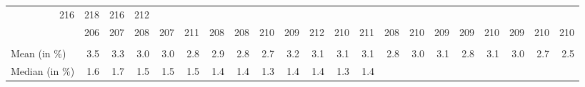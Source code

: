 \begin{tabular}{lllllllllllllllllllll}
  \multicolumn{1}{r}{216} &
  \multicolumn{1}{r}{218} &
  \multicolumn{1}{r}{216} &
  \multicolumn{1}{r}{212} \\
\multicolumn{1}{l}{\hspace{1em}{$\#$ origin countries}} &
  \multicolumn{1}{|r}{206} &
  \multicolumn{1}{r}{207} &
  \multicolumn{1}{r}{208} &
  \multicolumn{1}{r}{207} &
  \multicolumn{1}{r}{211} &
  \multicolumn{1}{r}{208} &
  \multicolumn{1}{r}{208} &
  \multicolumn{1}{r}{210} &
  \multicolumn{1}{r}{209} &
  \multicolumn{1}{r}{212} &
  \multicolumn{1}{r}{210} &
  \multicolumn{1}{r}{211} &
  \multicolumn{1}{r}{208} &
  \multicolumn{1}{r}{210} &
  \multicolumn{1}{r}{209} &
  \multicolumn{1}{r}{209} &
  \multicolumn{1}{r}{210} &
  \multicolumn{1}{r}{209} &
  \multicolumn{1}{r}{210} &
  \multicolumn{1}{r}{210} \\
\multicolumn{1}{l}{\hspace{1em}{\textit{Observed transport costs}}} &
  \multicolumn{1}{|r}{} &
  \multicolumn{1}{r}{} &
  \multicolumn{1}{r}{} &
  \multicolumn{1}{r}{} &
  \multicolumn{1}{r}{} &
  \multicolumn{1}{r}{} &
  \multicolumn{1}{r}{} &
  \multicolumn{1}{r}{} &
  \multicolumn{1}{r}{} &
  \multicolumn{1}{r}{} &
  \multicolumn{1}{r}{} &
  \multicolumn{1}{r}{} &
  \multicolumn{1}{r}{} &
  \multicolumn{1}{r}{} &
  \multicolumn{1}{r}{} &
  \multicolumn{1}{r}{} &
  \multicolumn{1}{r}{} &
  \multicolumn{1}{r}{} &
  \multicolumn{1}{r}{} &
  \multicolumn{1}{r}{} \\
\multicolumn{1}{l}{\hspace{2em}Mean (in $\%$)} &
  \multicolumn{1}{|r}{3.5} &
  \multicolumn{1}{r}{3.3} &
  \multicolumn{1}{r}{3.0} &
  \multicolumn{1}{r}{3.0} &
  \multicolumn{1}{r}{2.8} &
  \multicolumn{1}{r}{2.9} &
  \multicolumn{1}{r}{2.8} &
  \multicolumn{1}{r}{2.7} &
  \multicolumn{1}{r}{3.2} &
  \multicolumn{1}{r}{3.1} &
  \multicolumn{1}{r}{3.1} &
  \multicolumn{1}{r}{3.1} &
  \multicolumn{1}{r}{2.8} &
  \multicolumn{1}{r}{3.0} &
  \multicolumn{1}{r}{3.1} &
  \multicolumn{1}{r}{2.8} &
  \multicolumn{1}{r}{3.1} &
  \multicolumn{1}{r}{3.0} &
  \multicolumn{1}{r}{2.7} &
  \multicolumn{1}{r}{2.5} \\
\multicolumn{1}{l}{\hspace{2em}Median (in $\%$)} &
  \multicolumn{1}{|r}{1.6} &
  \multicolumn{1}{r}{1.7} &
  \multicolumn{1}{r}{1.5} &
  \multicolumn{1}{r}{1.5} &
  \multicolumn{1}{r}{1.5} &
  \multicolumn{1}{r}{1.4} &
  \multicolumn{1}{r}{1.4} &
  \multicolumn{1}{r}{1.3} &
  \multicolumn{1}{r}{1.4} &
  \multicolumn{1}{r}{1.4} &
  \multicolumn{1}{r}{1.3} &
  \multicolumn{1}{r}{1.4} &

\end{tabular}
